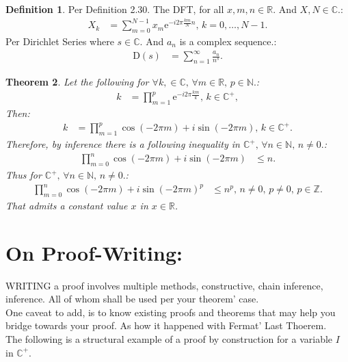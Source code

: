 \documentclass[10pt]{article}
\theoremstyle{plain}
\newtheorem{theorem}{Theorem}[section]
\theoremstyle{definition}
\newtheorem{definition}[theorem]{Definition}
\theoremstyle{remark}
\begin{document}
\begin{definition}
	Per Definition 2.30. The DFT, for all $x, m, n \in \mathbb{R}.$ And  $X, N \in \mathbb{C}.$:
	\begin{align*}
		X_k &= \sum_{m=0}^{N-1} x_{m}\mathrm{e}^{-i2\pi \frac{km}{N}n}, \, k = 0,\dots,N-1.
	\end{align*}
	Per Dirichlet Series where $s \in \mathbb{C}.$ And $a_{n}$ is a complex sequence.:
	\begin{align*}
		\mathrm{D}(s) &= \sum_{n=1}^{\infty} \frac{a_{n}}{n^{s}}.
	\end{align*}
\end{definition}

\begin{theorem}
	Let the following for $\forall k, \in \mathbb{C}, \, \forall m \in \mathbb{R}, \, p \in \mathbb{N}.$:
	\begin{align*}
		k &= \prod_{m=1}^{p} \mathrm{e}^{-i2\pi \frac{km}{k}}, \, k \in \mathbb{C}^{+},
	\end{align*}
	Then:
	\begin{align*}
		k &= \prod_{m=1}^{p} \cos (-2\pi m) + i \sin (-2\pi m), \, k \in \mathbb{C}^{+}.
	\end{align*}
	Therefore, by inference there is a following inequality in $\mathbb{C}^{+}, \, \forall n \in \mathbb{N}, \, n \neq 0.$:
	\begin{align*}
		\prod_{m=0}^{n} \cos (-2\pi m) + i \sin (-2\pi m) &\leq n.
	\end{align*}
	Thus for $\mathbb{C}^{+}, \, \forall n \in \mathbb{N}, \, n \neq 0.$:
	\begin{align*}
		\prod_{m=0}^{n} \cos (-2\pi m) + i \sin (-2\pi m)^{p} &\leq n^{p}, \, n \neq 0, \, p \neq 0, \, p \in \mathbb{Z}.
	\end{align*}
	That admits a constant value $x$ in $x \in \mathbb{R}$.
\end{theorem}

\section{On Proof-Writing:}

\lettrine[lines=2, lhang=0.1, loversize=0.2]{W}RITING a proof involves multiple methods, constructive, chain inference, inference. All of whom shall be used per your theorem' case.\\
One caveat to add, is to know existing proofs and theorems that may help you bridge towards your proof. As how it happened with Fermat' Last Thoerem.\\
The following is a structural example of a proof by construction for a variable $I$ in $\mathbb{C}^{+}.$
\end{document}
